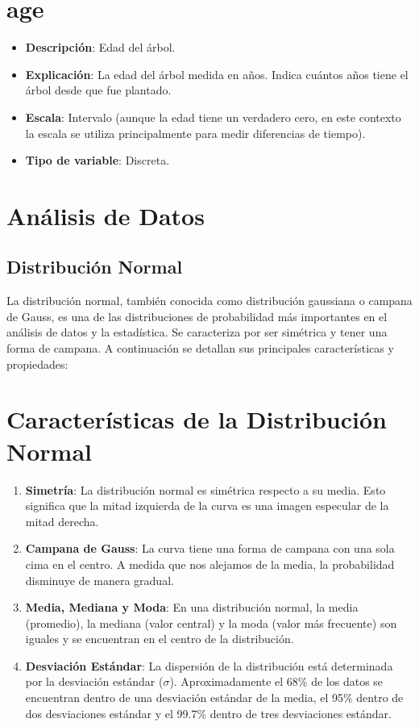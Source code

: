 \documentclass{article}
\begin{document}
\section*{age}

\begin{itemize}
    \item \textbf{Descripción}: Edad del árbol.
    \item \textbf{Explicación}: La edad del árbol medida en años. Indica cuántos años tiene el árbol desde que fue plantado.
    \item \textbf{Escala}: Intervalo (aunque la edad tiene un verdadero cero, en este contexto la escala se utiliza principalmente para medir diferencias de tiempo).
    \item \textbf{Tipo de variable}: Discreta.
\end{itemize}


\section*{Análisis de Datos}
\subsection*{Distribución Normal }
La distribución normal, también conocida como distribución gaussiana o campana de Gauss, es una de las distribuciones de probabilidad más importantes en el análisis de datos y la estadística. Se caracteriza por ser simétrica y tener una forma de campana. A continuación se detallan sus principales características y propiedades:

\section*{Características de la Distribución Normal}

\begin{enumerate}
    \item \textbf{Simetría}: La distribución normal es simétrica respecto a su media. Esto significa que la mitad izquierda de la curva es una imagen especular de la mitad derecha.
    \item \textbf{Campana de Gauss}: La curva tiene una forma de campana con una sola cima en el centro. A medida que nos alejamos de la media, la probabilidad disminuye de manera gradual.
    \item \textbf{Media, Mediana y Moda}: En una distribución normal, la media (promedio), la mediana (valor central) y la moda (valor más frecuente) son iguales y se encuentran en el centro de la distribución.
    \item \textbf{Desviación Estándar}: La dispersión de la distribución está determinada por la desviación estándar ($\sigma$). Aproximadamente el 68\% de los datos se encuentran dentro de una desviación estándar de la media, el 95\% dentro de dos desviaciones estándar y el 99.7\% dentro de tres desviaciones estándar.
\end{enumerate}
\end{document}

